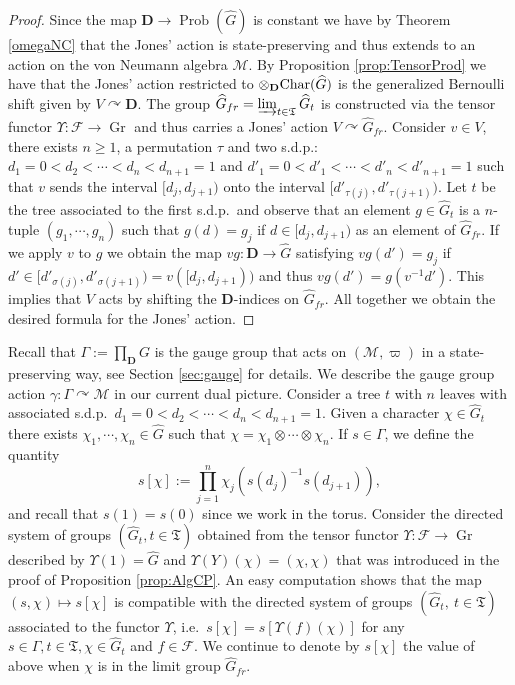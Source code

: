 \documentclass[a4paper,12pt]{amsart}
\numberwithin{equation}{section}
\theoremstyle{definition}
\DeclareMathOperator{\Gr}{Gr}
\newcommand{\act}{\curvearrowright}
\newcommand{\Ch}{\textup{Char}}
\newcommand{\D}{\mathbf D}
\newcommand{\dn}{d_1=0<d_2<\cdots<d_n<d_{n+1}=1}
\newcommand{\cF}{\mathcal F}
\newcommand{\ga}{\gamma}
\newcommand{\Ga}{\Gamma}
\newcommand{\scrM}{\mathscr M}
\newcommand{\ot}{\otimes}\newcommand{\otmin}{\otimes_{\text{min}}}
\DeclareMathOperator{\Prob}{Prob}
\newcommand{\fT}{\mathfrak T}
\newcommand{\wh}{\widehat}
\begin{document}
\begin{proof}
Since the map $\D\to \Prob(\wh G)$ is constant we have by Theorem \ref{omegaNC} that the Jones' action is state-preserving and thus extends to an action on the von Neumann algebra $\scrM.$
By Proposition \ref{prop:TensorProd} we have that the Jones' action restricted to $\ot_\D \Ch(\wh G)$ is the generalized Bernoulli shift given by $V\act \D$.
The group $\wh G_{fr}=\varinjlim_{t\in\fT} \wh G_t$ is constructed via the tensor functor $\Upsilon:\cF\to\Gr$ and thus carries a Jones' action $V\act \wh G_{fr}.$
Consider $v\in V$, there exists $n\geq 1$, a permutation $\tau$ and two s.d.p.: $d_1=0<d_2<\cdots<d_n<d_{n+1}=1$ and $d'_1=0<d'_1<\cdots<d'_n<d'_{n+1}=1$ such that $v$ sends the interval $[d_j,d_{j+1})$ onto the interval $[d'_{\tau(j)} , d'_{\tau(j+1)} ).$
Let $t$ be the tree associated to the first s.d.p.~and observe that an element $g\in \wh G_t$ is a $n$-tuple $(g_1,\cdots,g_n)$ such that $g(d) = g_j$ if $d\in [d_j,d_{j+1})$ as an element of $\wh G_{fr}.$
If we apply $v$ to $g$ we obtain the map $vg:\D\to \wh G$ satisfying $vg(d')=g_j$ if $d'\in [d'_{\sigma(j)} , d'_{\sigma(j+1)} ) = v ([d_j,d_{j+1}))$ and thus $vg(d') = g(v^{-1}d').$
This implies that $V$ acts by shifting the $\D$-indices on $\wh G_{fr}.$
All together we obtain the desired formula for the Jones' action.
\end{proof}

Recall that $\Ga:=\prod_\D G$ is the gauge group that acts on $(\scrM,\varpi)$ in a state-preserving way, see Section \ref{sec:gauge} for details.
We describe the gauge group action $\ga:\Ga\act \scrM$ in our current dual picture.
Consider a tree $t$ with $n$ leaves with associated s.d.p.~$\dn.$
Given a character $\chi \in\wh G_t$ there exists $\chi_1,\cdots,\chi_n \in\wh G$ such that $\chi = \chi_1\ot \cdots \ot \chi_n.$
If $s\in \Ga$, we define the quantity 
\begin{equation}\label{equa:gaugedual}s[\chi]:= \prod_{j=1}^n \chi_j(s(d_j)^{-1} s(d_{j+1}) ) , \end{equation} and recall that $s(1)=s(0)$ since we work in the torus.
Consider the directed system of groups $(\wh G_t,t\in\fT)$ obtained from the tensor functor $\Upsilon:\cF\to\Gr$ described by $\Upsilon(1)=\wh G$ and $\Upsilon(Y)(\chi)=(\chi,\chi)$ that was introduced in the proof of Proposition \ref{prop:AlgCP}.
%
An easy computation shows that the map $(s,\chi)\mapsto s[\chi]$ is compatible with the directed system of groups $(\wh G_t,\ t\in\fT)$ associated to the functor $\Upsilon$, i.e.~$s[\chi] = s[\Upsilon(f)(\chi)]$ for any $s\in\Ga, t\in\fT, \chi \in \wh G_t$ and $f\in\cF.$ We continue to denote by $s[\chi]$ the value of above when $\chi$ is in the limit group $\wh G_{fr}.$
\end{document}
